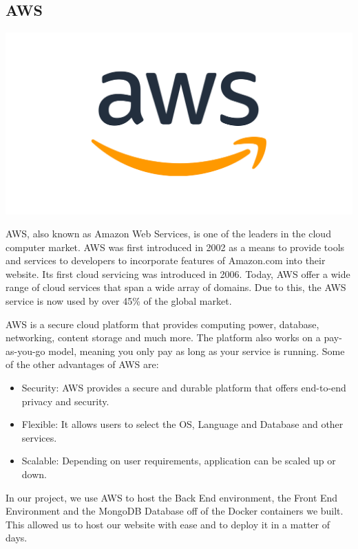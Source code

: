 \subsection{AWS}
\includegraphics[scale = 0.4]{img/aws_logo_smile_1200x630.png}\par
AWS, also known as Amazon Web Services, is one of the leaders in the cloud computer market. AWS was first introduced in 2002 as a means to provide tools and services to developers to incorporate features of Amazon.com into their website. Its first cloud servicing was introduced in 2006. Today, AWS offer a wide range of cloud services that span a wide array of domains. Due to this, the AWS service is now used by over 45\% of the global market. \par
AWS is a secure cloud platform that provides computing power, database, networking, content storage and much more. The platform also works on a pay-as-you-go model, meaning you only pay as long as your service is running. Some of the other advantages of AWS are:
\begin{itemize}
    \item Security: AWS provides a secure and durable platform that offers end-to-end privacy and security.
    \item Flexible: It allows users to select the OS, Language and Database and other services.
    \item Scalable: Depending on user requirements, application can be scaled up or down.
\end{itemize}
In our project, we use AWS to host the Back End environment, the Front End Environment and the MongoDB Database off of the Docker containers we built. This allowed us to host our website with ease and to deploy it in a matter of days.

